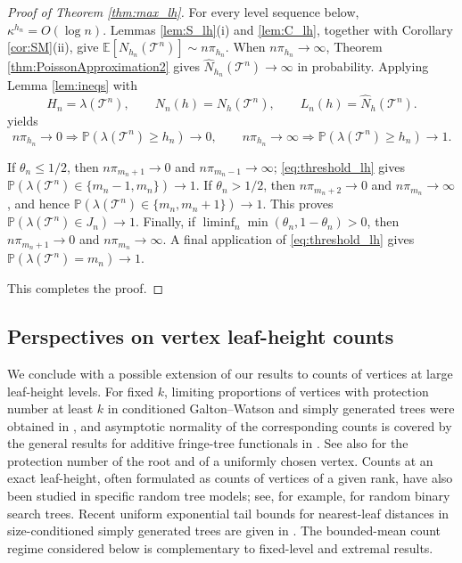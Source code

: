 \documentclass[a4paper,11pt]{article}
\newcommand{\E}{\mathbb{E}}
\DeclareRobustCommand{\P}{\mathbb{P}}
\DeclareRobustCommand{\1}{\mathbf{1}}
\begin{document}
\begin{proof}[Proof of Theorem \ref{thm:max_lh}]
  
  

For every level sequence below, $\kappa^{h_n}=O(\log n)$. Lemmas
\ref{lem:S_lh}\textup{(i)} and \ref{lem:C_lh}, together with Corollary
\ref{cor:SM}\textup{(ii)}, give
$
\E[N_{h_n}(\mathcal T^n)]\sim n\pi_{h_n}
$.
When $n\pi_{h_n}\to\infty$, Theorem
\ref{thm:PoissonApproximation2} gives
$\widehat N_{h_n}(\mathcal T^n)\to\infty$ in probability.  Applying Lemma \ref{lem:ineqs} with
$$
H_n=\lambda(\mathcal T^n),
\qquad
N_n(h)=N_h(\mathcal T^n),
\qquad
L_n(h)=\widehat N_h(\mathcal T^n).
$$ yields
\begin{equation}
\label{eq:threshold_lh}
n\pi_{h_n}\to0\Longrightarrow
\P(\lambda(\mathcal T^n)\ge h_n)\to0,
\qquad
n\pi_{h_n}\to\infty\Longrightarrow
\P(\lambda(\mathcal T^n)\ge h_n)\to1.
\end{equation}

If $\theta_n\le1/2$, then
$n\pi_{m_n+1}\to0$ and $n\pi_{m_n-1}\to\infty$;
\eqref{eq:threshold_lh} gives
$
\P(\lambda(\mathcal T^n)\in\{m_n-1,m_n\})\to1$.
If $\theta_n>1/2$, then
$n\pi_{m_n+2}\to0$ and $n\pi_{m_n}\to\infty$, and hence
$
\P(\lambda(\mathcal T^n)\in\{m_n,m_n+1\})\to1$.
This proves $\P(\lambda(\mathcal T^n)\in J_n)\to1$.
Finally, if
$\liminf_n\min(\theta_n,1-\theta_n)>0$, then
$n\pi_{m_n+1}\to0$ and $n\pi_{m_n}\to\infty$. A final application of
\eqref{eq:threshold_lh} gives
$
\P(\lambda(\mathcal T^n)=m_n)\to1
$.

  This completes the proof.
\end{proof}

\subsection{Perspectives on vertex leaf-height counts}
\label{ssec:lhperspectives}

We conclude with a possible extension of our results to counts of vertices at
large leaf-height levels.  For fixed $k$, limiting proportions of vertices with
protection number at least $k$ in conditioned Galton--Watson and simply
generated trees were obtained in \cite{DJ14}, and asymptotic
normality of the corresponding counts is covered by the general results for
additive fringe-tree functionals in \cite{Jan16}. See also
\cite{GGLS23} for the protection number of the root and of a
uniformly chosen vertex. Counts at an exact leaf-height, often formulated as
counts of vertices of a given rank, have also been studied in specific random
tree models; see, for example,
\cite{BP17} for random binary search
trees. Recent uniform exponential tail bounds for nearest-leaf distances in
size-conditioned simply generated trees are given in
\cite{MS26}. The bounded-mean
count regime considered below is complementary to  fixed-level and
extremal results.
\end{document}
